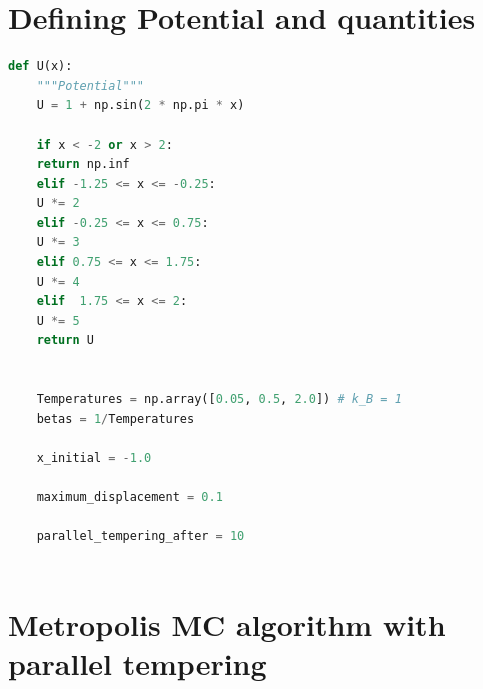 \documentclass[11pt]{article}
\begin{document}
\newpage
\begin{appendices}
\section{Defining Potential and quantities} \label{ap:potential}
\begin{lstlisting}[language=Python, caption={Defining the potential and fixed quantities}]
def U(x):
	"""Potential"""
	U = 1 + np.sin(2 * np.pi * x)
	
	if x < -2 or x > 2:
	return np.inf
	elif -1.25 <= x <= -0.25:
	U *= 2
	elif -0.25 <= x <= 0.75:
	U *= 3
	elif 0.75 <= x <= 1.75:
	U *= 4
	elif  1.75 <= x <= 2:
	U *= 5
	return U
	
	
	Temperatures = np.array([0.05, 0.5, 2.0]) # k_B = 1
	betas = 1/Temperatures
	
	x_initial = -1.0
	
	maximum_displacement = 0.1
	
	parallel_tempering_after = 10
	
\end{lstlisting}

\section{Metropolis MC algorithm with parallel tempering}\label{ap:mcstep}




\end{appendices}
\end{document}
